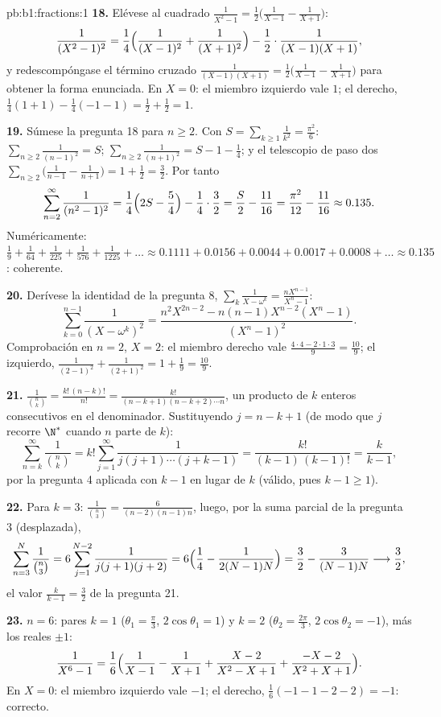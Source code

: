 \begin{solution}{pb:b1:fractions:1}
\textbf{18.} Elévese al cuadrado
$\frac1{X^2-1} = \frac12\bigl(\frac1{X-1} - \frac1{X+1}\bigr)$:
\[
\frac1{(X^2-1)^2} = \frac14\Bigl(\frac1{(X-1)^2} +
\frac1{(X+1)^2}\Bigr) - \frac12\cdot\frac1{(X-1)(X+1)} ,
\]
y redescompóngase el término cruzado
$\frac1{(X-1)(X+1)} = \frac12\bigl(\frac1{X-1} - \frac1{X+1}\bigr)$
para obtener la forma enunciada. En $X = 0$: el miembro izquierdo vale
$1$; el derecho, $\frac14(1 + 1) - \frac14(-1 - 1) = \frac12 + \frac12 = 1$.

\textbf{19.} Súmese la pregunta 18 para $n \geq 2$. Con
$S = \sum_{k\geq1}\frac1{k^2} = \frac{\pi^2}6$:
$\sum_{n\geq2}\frac1{(n-1)^2} = S$;
$\sum_{n\geq2}\frac1{(n+1)^2} = S - 1 - \frac14$; y el telescopio de
paso dos $\sum_{n\geq2}\bigl(\frac1{n-1} - \frac1{n+1}\bigr) =
1 + \frac12 = \frac32$. Por tanto
\[
\sum_{n=2}^{\infty}\frac1{(n^2-1)^2}
= \frac14\Bigl(2S - \frac54\Bigr) - \frac14\cdot\frac32
= \frac S2 - \frac{11}{16}
= \frac{\pi^2}{12} - \frac{11}{16} \approx 0.135 .
\]
Numéricamente: $\frac19 + \frac1{64} + \frac1{225} + \frac1{576} +
\frac1{1225} + \dots \approx 0.1111 + 0.0156 + 0.0044 + 0.0017 +
0.0008 + \dots \approx 0.135$: coherente.

\textbf{20.} Derívese la identidad de la pregunta 8,
$\sum_k\frac1{X-\omega^k} = \frac{nX^{n-1}}{X^n-1}$:
\[
\sum_{k=0}^{n-1}\frac1{(X - \omega^k)^2}
= \frac{n^2X^{2n-2} - n(n-1)X^{n-2}(X^n - 1)}{(X^n - 1)^2} .
\]
Comprobación en $n = 2$, $X = 2$: el miembro derecho vale
$\frac{4\cdot4 - 2\cdot1\cdot3}{9} = \frac{10}9$; el izquierdo,
$\frac1{(2-1)^2} + \frac1{(2+1)^2} = 1 + \frac19 = \frac{10}9$.

\textbf{21.} $\frac1{\binom nk} = \frac{k!\,(n-k)!}{n!} =
\frac{k!}{(n-k+1)(n-k+2)\cdots n}$, un producto de $k$ enteros
consecutivos en el denominador. Sustituyendo $j = n - k + 1$ (de modo
que $j$ recorre $\N^*$ cuando $n$ parte de $k$):
\[
\sum_{n=k}^{\infty}\frac1{\binom nk}
= k!\sum_{j=1}^{\infty}\frac1{j(j+1)\cdots(j+k-1)}
= \frac{k!}{(k-1)\,(k-1)!} = \frac{k}{k-1} ,
\]
por la pregunta 4 aplicada con $k - 1$ en lugar de $k$ (válido, pues
$k - 1 \geq 1$).

\textbf{22.} Para $k = 3$: $\frac1{\binom n3} = \frac6{(n-2)(n-1)n}$,
luego, por la suma parcial de la pregunta 3 (desplazada),
\[
\sum_{n=3}^{N}\frac1{\binom n3}
= 6\sum_{j=1}^{N-2}\frac1{j(j+1)(j+2)}
= 6\Bigl(\frac14 - \frac1{2(N-1)N}\Bigr)
= \frac32 - \frac3{(N-1)N}
\longrightarrow \frac32 ,
\]
el valor $\frac k{k-1} = \frac32$ de la pregunta 21.

\textbf{23.} $n = 6$: pares $k = 1$ ($\theta_1 = \frac\pi3$,
$2\cos\theta_1 = 1$) y $k = 2$ ($\theta_2 = \frac{2\pi}3$,
$2\cos\theta_2 = -1$), más los  reales $\pm1$:
\[
\frac1{X^6-1} = \frac16\Bigl(\frac1{X-1} - \frac1{X+1}
+ \frac{X - 2}{X^2 - X + 1}
+ \frac{-X - 2}{X^2 + X + 1}\Bigr) .
\]
En $X = 0$: el miembro izquierdo vale $-1$; el derecho,
$\frac16(-1 - 1 - 2 - 2) = -1$: correcto.


\end{solution}
